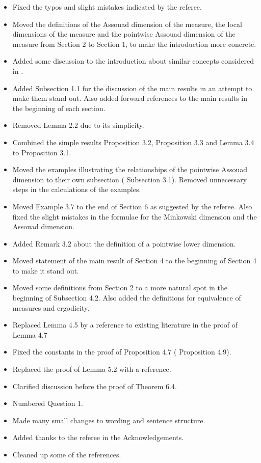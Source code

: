 \documentclass[12pt]{amsart}
\numberwithin{equation}{section}
\newcommand{\old}[1]{{\color{red} #1}}
\newcommand{\new}[1]{{\color{blue} #1}}
\theoremstyle{plain}
\theoremstyle{definition}
\theoremstyle{remark}
\begin{document}
\begin{itemize}
    \item Fixed the typos and slight mistakes indicated by the referee.
    \item Moved the definitions of the Assouad dimension of the measure, the local dimensions of the measure and the pointwise Assouad dimension of the measure from \old{Section 2} to \new{Section 1}, to make the introduction more concrete.
    \item Added some discussion to the introduction about similar concepts considered in \cite{BBL}.
    \item Added \new{Subsection 1.1} for the discussion of the main results in an attempt to make them stand out. Also added forward references to the main results in the beginning of each section.
    \item Removed \old{Lemma 2.2} due to its simplicity.
    \item Combined the simple results \old{Proposition 3.2}, \old{Proposition 3.3} and \old{Lemma 3.4} to \new{Proposition 3.1}.
    \item Moved the examples illustrating the relationships of the pointwise Assouad dimension to their own subsection (\new{Subsection 3.1}). Removed unnecessary steps in the calculations of the examples.
    \item Moved \old{Example 3.7} to the end of \new{Section 6} as suggested by the referee. Also fixed the slight mistakes in the formulae for the Minkowski dimension and the Assouad dimension.
    \item Added \new{Remark 3.2} about the definition of a pointwise lower dimension.
    \item Moved statement of the main result of \old{Section 4} to the beginning of \new{Section 4} to make it stand out.
    \item Moved some definitions from \old{Section 2} to a more natural spot in the beginning of \new{Subsection 4.2}. Also added the definitions for equivalence of measures and ergodicity.
    \item Replaced \old{Lemma 4.5} by a reference to existing literature in the proof of \new{Lemma 4.7}
    \item Fixed the constants in the proof of \old{Proposition 4.7} (\new{Proposition 4.9}).
    \item Replaced the proof of Lemma 5.2 with a reference.
    \item Clarified discussion before the proof of \new{Theorem 6.4}.
    \item Numbered \new{Question 1}.
    \item Made many small changes to wording and sentence structure.
    \item Added thanks to the referee in the Acknowledgements.
    \item Cleaned up some of the references.
\end{itemize}



\end{document}
